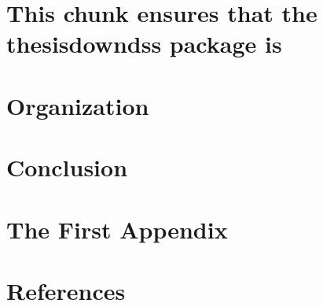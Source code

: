 \documentclass[12pt,twoside]{dukestatscithesis}
\theoremstyle{definition}
\theoremstyle{definition}
\theoremstyle{definition}
\theoremstyle{remark}
\begin{document}
\chapter{This chunk ensures that the thesisdowndss package
is}\label{this-chunk-ensures-that-the-thesisdowndss-package-is}

\chapter{Organization}\label{organization}

\chapter*{Conclusion}\label{conclusion}

\chapter{The First Appendix}\label{the-first-appendix}

\chapter*{References}\label{references}


\end{document}
